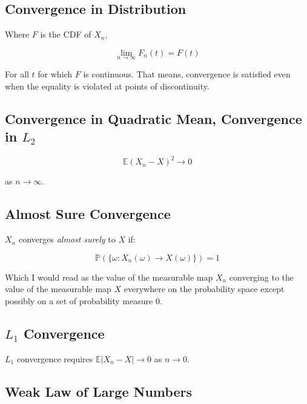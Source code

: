\subsection{Convergence in Distribution}
Where $F$ is the CDF of $X_n$,

\begin{equation}
\lim_{n\rightarrow \infty} F_n(t) = F(t)
\end{equation}

For all $t$ for which $F$ is continuous. That means, convergence is satisfied even when the equality is violated at points of discontinuity.


\subsection{Convergence in Quadratic Mean, Convergence in $L_2$}

\begin{equation}
\mathbb{E}(X_n - X)^2 \rightarrow 0
\end{equation}

as $n\rightarrow \infty$.


\subsection{Almost Sure Convergence}

$X_n$ converges \textit{almost surely} to $X$ if:

\begin{equation}
\mathbb{P}(\{\omega: X_n(\omega) \rightarrow X(\omega) \}) = 1
\end{equation}

Which I would read as the value of the measurable map $X_n$ converging to the value of the measurable map $X$ everywhere on the probability space except possibly on a set of probability measure $0$.


\subsection{$L_1$ Convergence}

$L_1$ convergence requires $\mathbb{E}|X_n - X| \rightarrow 0$ as $n\rightarrow 0$.



\subsection{Weak Law of Large Numbers}

